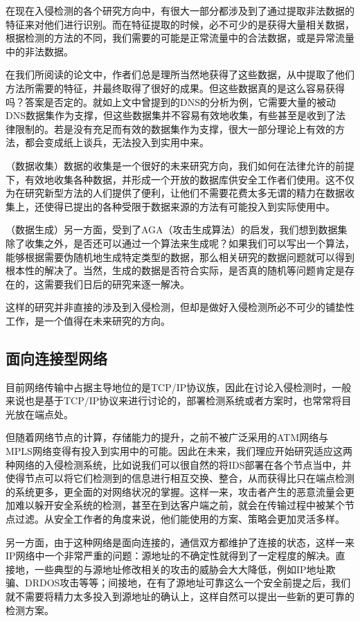 \documentclass[12pt]{article} %
\begin{document}
在现在入侵检测的各个研究方向中，有很大一部分都涉及到了通过提取非法数据的特征来对他们进行识别。而在特征提取的时候，必不可少的是获得大量相关数据，根据检测的方法的不同，我们需要的可能是正常流量中的合法数据，或是异常流量中的非法数据。

在我们所阅读的论文中，作者们总是理所当然地获得了这些数据，从中提取了他们方法所需要的特征，并最终取得了很好的成果。但这些数据真的是这么容易获得吗？答案是否定的。就如上文中曾提到的DNS的分析为例，它需要大量的被动DNS数据集作为支撑，但这些数据集并不容易有效地收集，有些甚至是收到了法律限制的。若是没有充足而有效的数据集作为支撑，很大一部分理论上有效的方法，都会变成纸上谈兵，无法投入到实用中来。

（数据收集）数据的收集是一个很好的未来研究方向，我们如何在法律允许的前提下，有效地收集各种数据，并形成一个开放的数据库供安全工作者们使用。这不仅为在研究新型方法的人们提供了便利，让他们不需要花费太多无谓的精力在数据收集上，还使得已提出的各种受限于数据来源的方法有可能投入到实际使用中。

（数据生成）另一方面，受到了AGA（攻击生成算法）的启发，我们想到数据集除了收集之外，是否还可以通过一个算法来生成呢？如果我们可以写出一个算法，能够根据需要伪随机地生成特定类型的数据，那么相关研究的数据问题就可以得到根本性的解决了。当然，生成的数据是否符合实际，是否真的随机等问题肯定是存在的，这需要我们日后的研究来逐一解决。

这样的研究并非直接的涉及到入侵检测，但却是做好入侵检测所必不可少的铺垫性工作，是一个值得在未来研究的方向。

\subsection{面向连接型网络}
\label{connect}

目前网络传输中占据主导地位的是TCP/IP协议族，因此在讨论入侵检测时，一般来说也是基于TCP/IP协议来进行讨论的，部署检测系统或者方案时，也常常将目光放在端点处。

但随着网络节点的计算，存储能力的提升，之前不被广泛采用的ATM网络与MPLS网络变得有投入到实用中的可能。因此在未来，我们理应开始研究适应这两种网络的入侵检测系统，比如说我们可以很自然的将IDS部署在各个节点当中，并使得节点可以将它们检测到的信息进行相互交换、整合，从而获得比只在端点检测的系统更多，更全面的对网络状况的掌握。这样一来，攻击者产生的恶意流量会更加难以躲开安全系统的检测，甚至在到达客户端之前，就会在传输过程中被某个节点过滤。从安全工作者的角度来说，他们能使用的方案、策略会更加灵活多样。

另一方面，由于这种网络是面向连接的，通信双方都维护了连接的状态，这样一来IP网络中一个非常严重的问题：源地址的不确定性就得到了一定程度的解决。直接地，一些典型的与源地址修改相关的攻击的威胁会大大降低，例如IP地址欺骗、DRDOS攻击等等；间接地，在有了源地址可靠这么一个安全前提之后，我们就不需要将精力太多投入到源地址的确认上，这样自然可以提出一些新的更可靠的检测方案。
\end{document}
